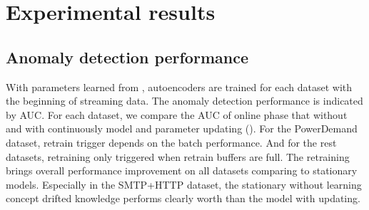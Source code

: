 \chapter{Experimental results}
\label{chap:results}


\section{Anomaly detection performance}
\label{sec:performance}

With parameters learned from , autoencoders are trained for each dataset with the beginning of streaming data. The anomaly detection performance is indicated by AUC. For each dataset, we compare the AUC of online phase that without and with continuously model and parameter updating (). For the PowerDemand dataset, retrain trigger depends on the batch performance. And for the rest datasets, retraining only triggered when retrain buffers are full. The retraining brings overall performance improvement on all datasets comparing to stationary models. Especially in the SMTP+HTTP dataset, the stationary without learning concept drifted knowledge performs clearly worth than the model with updating.

